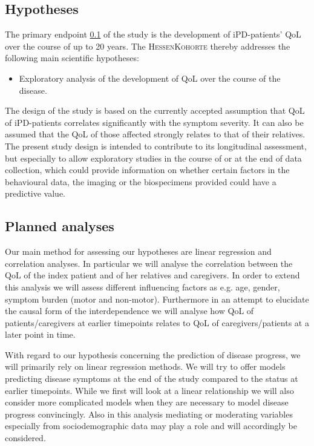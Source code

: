 \subsection{Hypotheses}
\label{sec:hypoTheses}
The primary endpoint \ref{sec:hypoTheses} of the study is the development of \ac{iPD}-patients' \ac{QoL} over the course of up to 20 years. The \textsc{HessenKohorte} thereby addresses the following main scientific hypotheses:
\begin{itemize}
  \item Exploratory analysis of the development of \acl{QoL} over the course of the disease.
\end{itemize}
The design of the study is based on the currently accepted assumption that \ac{QoL} of \ac{iPD}-patients correlates significantly with the symptom severity. It can also be assumed that the \ac{QoL} of those affected strongly relates to that of their relatives. The present study design is intended to contribute to its longitudinal assessment, but especially to allow exploratory studies in the course of or at the end of data collection, which could provide information on whether certain factors in the behavioural data, the imaging or the biospecimens provided could have a predictive value.

\subsection{Planned analyses}
Our main method for assessing our hypotheses are linear regression and correlation analyses. In particular we will analyse the correlation between the \ac{QoL} of the index patient and of her relatives and caregivers. In order to extend this analysis we will assess different influencing factors as e.g. age, gender, symptom burden (motor and non-motor). Furthermore in an attempt to elucidate the causal form of the interdependence we will analyse how \ac{QoL} of patients/caregivers at earlier timepoints relates to \ac{QoL} of caregivers/patients at a later point in time.

With regard to our hypothesis concerning the prediction of disease progress, we will primarily rely on linear regression methods. We will try to offer models predicting disease symptoms at the end of the study compared to the status at earlier timepoints. While we first will look at a linear relationship we will also consider more complicated models when they are necessary to model disease progress convincingly. Also in this analysis mediating or moderating variables especially from sociodemographic data may play a role and will accordingly be considered.

